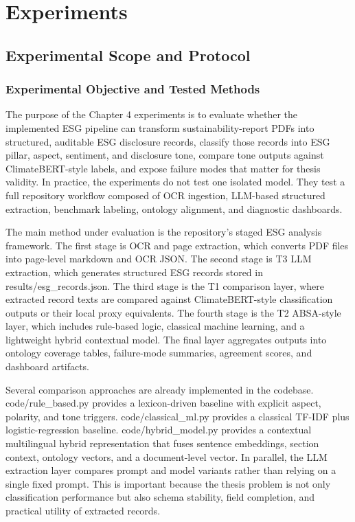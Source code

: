 \documentclass[english, online, cse, master]{dithesis}
\begin{document}
     
\chapter{Experiments}
  \label{experiments}
  \section{Experimental Scope and Protocol}

\subsection{Experimental Objective and Tested Methods}

The purpose of the Chapter 4 experiments is to evaluate whether the implemented ESG pipeline can transform sustainability-report PDFs into structured, auditable ESG disclosure records, classify those records into ESG pillar, aspect, sentiment, and disclosure tone, compare tone outputs against ClimateBERT-style labels, and expose failure modes that matter for thesis validity. In practice, the experiments do not test one isolated model. They test a full repository workflow composed of OCR ingestion, LLM-based structured extraction, benchmark labeling, ontology alignment, and diagnostic dashboards.

The main method under evaluation is the repository’s staged ESG analysis framework. The first stage is OCR and page extraction, which converts PDF files into page-level markdown and OCR JSON. The second stage is T3 LLM extraction, which generates structured ESG records stored in results/esg\_records.json. The third stage is the T1 comparison layer, where extracted record texts are compared against ClimateBERT-style classification outputs or their local proxy equivalents. The fourth stage is the T2 ABSA-style layer, which includes rule-based logic, classical machine learning, and a lightweight hybrid contextual model. The final layer aggregates outputs into ontology coverage tables, failure-mode summaries, agreement scores, and dashboard artifacts.

Several comparison approaches are already implemented in the codebase. code/rule\_based.py provides a lexicon-driven baseline with explicit aspect, polarity, and tone triggers. code/classical\_ml.py provides a classical TF-IDF plus logistic-regression baseline. code/hybrid\_model.py provides a contextual multilingual hybrid representation that fuses sentence embeddings, section context, ontology vectors, and a document-level vector. In parallel, the LLM extraction layer compares prompt and model variants rather than relying on a single fixed prompt. This is important because the thesis problem is not only classification performance but also schema stability, field completion, and practical utility of extracted records.
\end{document}
